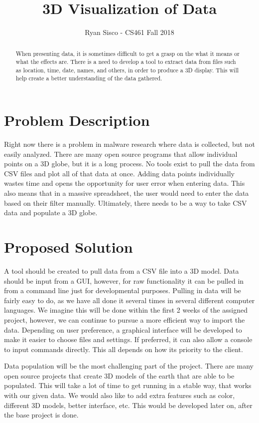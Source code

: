 \documentclass[letterpaper, 10pt] {article}
\title{3D Visualization of Data}
\author{Ryan Sisco - CS461 Fall 2018}
\begin{document}
\begin{titlingpage}
	\maketitle
	\vspace*{\fill}
	\begin{abstract}
	When presenting data, it is sometimes difficult to get a grasp on the what it means or what the effects are. There is a need to develop a tool to extract data from files such as location, time, date, names, and others, in order to produce a 3D display. This will help create a better understanding of the data gathered. 
	\end{abstract}
\end{titlingpage}
\section{Problem Description}
Right now there is a problem in malware research where data is collected, but not easily analyzed. There are many open source programs that allow individual points on a 3D globe, but it is a long process. No tools exist to pull the data from CSV files and plot all of that data at once. Adding data points individually wastes time and opens the opportunity for user error when entering data. This also means that in a massive spreadsheet, the user would need to enter the data based on their filter manually. Ultimately, there needs to be a way to take CSV data and populate a 3D globe.
\section{Proposed Solution}
A tool should be created to pull data from a CSV file into a 3D model. Data should be input from a GUI, however, for raw functionality it can be pulled in from a command line just for developmental purposes. Pulling in data will be fairly easy to do, as we have all done it several times in several different computer languages. We imagine this will be done within the first 2 weeks of the assigned project, however, we can continue to pursue a more efficient way to import the data.	Depending on user preference, a graphical interface will be developed to make it easier to choose files and settings. If preferred, it can also allow a console to input commands directly. This all depends on how its priority to the client. 

Data population will be the most challenging part of the project. There are many open source projects that create 3D models of the earth that are able to be populated.	This will take a lot of time to get running in a stable way, that works with our given data. We would also like to add extra features such as color, different 3D models, better interface, etc. This would be developed later on, after the base project is done. 
\end{document}
